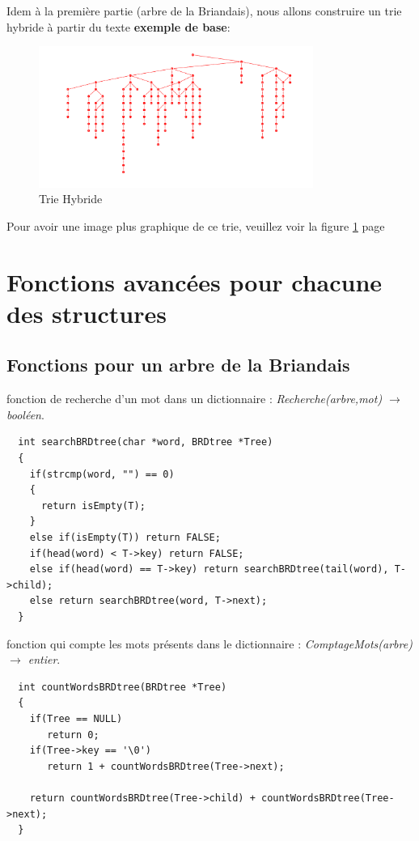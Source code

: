 \documentclass[a4paper,8pt]{report}
\begin{document}
Idem \`a la premi\`ere partie (arbre de la Briandais), nous allons construire un trie hybride \`a partir du texte \textbf{exemple de base}:\\
\begin{figure}[H]
  \centering
  \includegraphics[width=0.8\textwidth]{hybrid.png}
  \caption{Trie Hybride}
  \label{fig:Trie Hybride}
\end{figure}
\medskip
Pour avoir une image plus graphique de ce trie, veuillez voir la figure \ref{fig:Trie Hybride} page~\pageref{fig:Trie Hybride}

\chapter{Fonctions avanc\'ees pour chacune des structures}

\section*{Fonctions pour un arbre de la Briandais}\label{sec:name}

fonction de recherche d'un mot dans un dictionnaire : \textit{Recherche(arbre,mot) $\rightarrow$ bool\'een}.
\begin{verbatim}
  int searchBRDtree(char *word, BRDtree *Tree)
  {
    if(strcmp(word, "") == 0)
    {
      return isEmpty(T);
    }
    else if(isEmpty(T)) return FALSE;
    if(head(word) < T->key) return FALSE;
    else if(head(word) == T->key) return searchBRDtree(tail(word), T->child);
    else return searchBRDtree(word, T->next);
  }
\end{verbatim}

fonction qui compte les mots pr\'esents dans le dictionnaire : \textit{ComptageMots(arbre) $\rightarrow$ entier}.
\begin{verbatim}
  int countWordsBRDtree(BRDtree *Tree)
  {
    if(Tree == NULL)
       return 0;
    if(Tree->key == '\0')
       return 1 + countWordsBRDtree(Tree->next);

    return countWordsBRDtree(Tree->child) + countWordsBRDtree(Tree->next);
  }
\end{verbatim}
\end{document}
